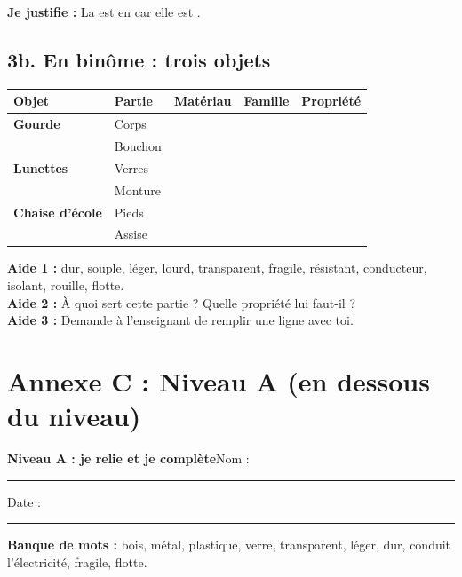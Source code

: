 \documentclass[11pt,a4paper]{article}
\newcommand{\entete}[2]{%
  \begin{tcolorbox}[colback=#1!10,colframe=#1!70!black,boxrule=0.8pt,arc=2mm]
  {\Large\bfseries #2}\hfill Nom : \rule{4cm}{0.3pt}\quad Date : \rule{2.2cm}{0.3pt}
  \end{tcolorbox}}
\begin{document}
\medskip
\textbf{Je justifie :} La \dotfill{} est en \dotfill{} car elle est \dotfill.

\subsection*{3b. En binôme : trois objets}
\begin{tabularx}{\linewidth}{>{\bfseries}p{2.4cm}p{2.6cm}Y p{2cm}Y}
\toprule
Objet & Partie & Matériau & Famille & Propriété\\
\midrule
Gourde & Corps & & & \\
 & Bouchon & & & \\
\midrule
Lunettes & Verres & & & \\
 & Monture & & & \\
\midrule
Chaise d'école & Pieds & & & \\
 & Assise & & & \\
\bottomrule
\end{tabularx}

\begin{tcolorbox}[colback=yellow!10,colframe=yellow!50!black,title={Cartes d'aide à utiliser dans l'ordre},fonttitle=\bfseries\small]
\textbf{Aide 1 :} dur, souple, léger, lourd, transparent, fragile, résistant, conducteur, isolant, rouille, flotte.\\
\textbf{Aide 2 :} À quoi sert cette partie ? Quelle propriété lui faut-il ?\\
\textbf{Aide 3 :} Demande à l'enseignant de remplir une ligne avec toi.
\end{tcolorbox}

\newpage
\section*{Annexe C : Niveau A (en dessous du niveau)}
\entete{orange}{Niveau A : je relie et je complète}

\textbf{Banque de mots :} \textcolor{brown!70!black}{bois}, \textcolor{gray!70!black}{métal}, \textcolor{blue!70!black}{plastique}, \textcolor{green!50!black}{verre}, transparent, léger, dur, conduit l'électricité, fragile, flotte.
\end{document}
